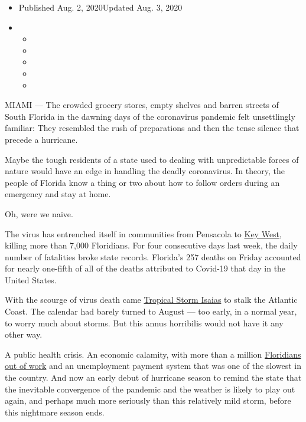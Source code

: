 \begin{itemize}
\item
  Published Aug. 2, 2020Updated Aug. 3, 2020
\item
  \begin{itemize}
  \item
  \item
  \item
  \item
  \item
  \end{itemize}
\end{itemize}

MIAMI --- The crowded grocery stores, empty shelves and barren streets
of South Florida in the dawning days of the coronavirus pandemic felt
unsettlingly familiar: They resembled the rush of preparations and then
the tense silence that precede a hurricane.

Maybe the tough residents of a state used to dealing with unpredictable
forces of nature would have an edge in handling the deadly coronavirus.
In theory, the people of Florida know a thing or two about how to follow
orders during an emergency and stay at home.

Oh, were we naïve.

The virus has entrenched itself in communities from Pensacola to
\href{https://www.nytimes3xbfgragh.onion/2020/07/31/us/coronavirus-masks-enforcement-key-west.html?referringSource=articleShare}{Key
West}, killing more than 7,000 Floridians. For four consecutive days
last week, the daily number of fatalities broke state records. Florida's
257 deaths on Friday accounted for nearly one-fifth of all of the deaths
attributed to Covid-19 that day in the United States.

With the scourge of virus death came
\href{https://www.nytimes3xbfgragh.onion/2020/08/03/us/isaias-storm-updates.html}{Tropical
Storm Isaias} to stalk the Atlantic Coast. The calendar had barely
turned to August --- too early, in a normal year, to worry much about
storms. But this annus horribilis would not have it any other way.

A public health crisis. An economic calamity, with more than a million
\href{https://www.nytimes3xbfgragh.onion/2020/04/23/us/florida-coronavirus-unemployment.html}{Floridians
out of work} and an unemployment payment system that was one of the
slowest in the country. And now an early debut of hurricane season to
remind the state that the inevitable convergence of the pandemic and the
weather is likely to play out again, and perhaps much more seriously
than this relatively mild storm, before this nightmare season ends.

